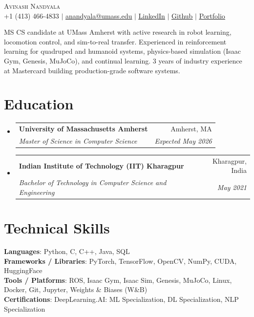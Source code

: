 \documentclass[letterpaper,11pt]{article}
\makeatletter
\newcommand{\resumeSubheading}[4]{
  \vspace{-2pt}\item
    \begin{tabular*}{0.97\textwidth}[t]{l@{\extracolsep{\fill}}r}
      \textbf{#1} & #2 \\
      \textit{\small#3} & \textit{\small #4} \\
    \end{tabular*}\vspace{-7pt}
}
\newcommand{\resumeSubHeadingListStart}{\begin{itemize}[leftmargin=0.15in, label={}]}
\newcommand{\resumeSubHeadingListEnd}{\end{itemize}}
\makeatother
\begin{document}

\begin{center}
  {\Huge\textsc{Avinash Nandyala}} \\ \vspace{1pt}
  \small +1 (413) 466-4833 $|$ \href{mailto:anandyala@umass.edu}{\underline{anandyala@umass.edu}} $|$
  \href{https://www.linkedin.com/in/avinash-nandyala-06a88b199/}{\underline{LinkedIn}} $|$
  \href{https://github.com/navinash47}{\underline{Github}} $|$
  \href{https://navinash47.github.io/Portfolio/}{\underline{Portfolio}}
\end{center}

\begin{center}
  \small{MS CS candidate at UMass Amherst with active research in robot learning, locomotion control, and sim-to-real transfer. Experienced in reinforcement learning for quadruped and humanoid systems, physics-based simulation (Isaac Gym, Genesis, MuJoCo), and continual learning. 3 years of industry experience at Mastercard building production-grade software systems.}
\end{center}

\section{Education}
\resumeSubHeadingListStart
  \resumeSubheading
    {University of Massachusetts Amherst}{Amherst, MA}
    {Master of Science in Computer Science}{Expected May 2026}
  \resumeSubheading
    {Indian Institute of Technology (IIT) Kharagpur}{Kharagpur, India}
    {Bachelor of Technology in Computer Science and Engineering}{May 2021}
\resumeSubHeadingListEnd


\section{Technical Skills}
\begin{itemize}[leftmargin=0.15in, label={}]
  \small{\item{
    \textbf{Languages}{: Python, C, C++, Java, SQL} \\
    \textbf{Frameworks / Libraries}{: PyTorch, TensorFlow, OpenCV, NumPy, CUDA, HuggingFace} \\
    \textbf{Tools / Platforms}{: ROS, Isaac Gym, Isaac Sim, Genesis, MuJoCo, Linux, Docker, Git, Jupyter, Weights \& Biases (W\&B)} \\
    \textbf{Certifications}{: DeepLearning.AI: ML Specialization, DL Specialization, NLP Specialization}
  }}
\end{itemize}
\end{document}
